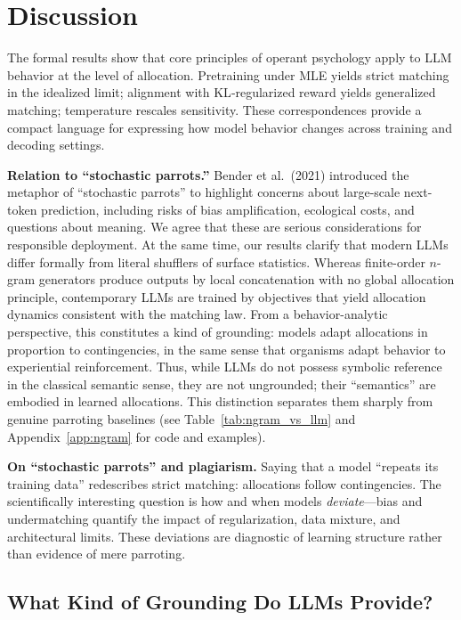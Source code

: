 \documentclass[11pt]{article}
\begin{document}
\section{Discussion}
The formal results show that core principles of operant psychology apply to LLM behavior at the level of allocation. Pretraining under MLE yields strict matching in the idealized limit; alignment with KL‑regularized reward yields generalized matching; temperature rescales sensitivity. These correspondences provide a compact language for expressing how model behavior changes across training and decoding settings.

\textbf{Relation to ``stochastic parrots.''}
Bender et al.\ (2021) introduced the metaphor of ``stochastic parrots'' to
highlight concerns about large-scale next-token prediction, including risks of
bias amplification, ecological costs, and questions about meaning. We agree
that these are serious considerations for responsible deployment. At the same
time, our results clarify that modern LLMs differ formally from literal
shufflers of surface statistics. Whereas finite-order $n$-gram generators
produce outputs by local concatenation with no global allocation principle,
contemporary LLMs are trained by objectives that yield allocation dynamics
consistent with the matching law. From a behavior-analytic perspective, this
constitutes a kind of grounding: models adapt allocations in proportion to
contingencies, in the same sense that organisms adapt behavior to experiential
reinforcement. Thus, while LLMs do not possess symbolic reference in the
classical semantic sense, they are not ungrounded; their ``semantics'' are
embodied in learned allocations. This distinction separates them sharply from
genuine parroting baselines (see Table~\ref{tab:ngram_vs_llm} and
Appendix~\ref{app:ngram} for code and examples).

\textbf{On “stochastic parrots” and plagiarism.} Saying that a model “repeats its training data” redescribes strict matching: allocations follow contingencies. The scientifically interesting question is how and when models \emph{deviate}—bias and undermatching quantify the impact of regularization, data mixture, and architectural limits. These deviations are diagnostic of learning structure rather than evidence of mere parroting.

\subsection*{What Kind of Grounding Do LLMs Provide?}
\end{document}
